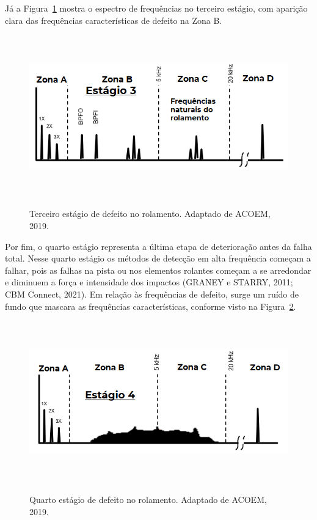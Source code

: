 \documentclass[
	12pt,				
	oneside,			
	a4paper,			
	english,			
	brazil,			
	]{abntex2ppgsi}
\begin{document}
Já a Figura~\ref{estagio_3} mostra o espectro de frequências no terceiro estágio, com aparição clara das frequências características de defeito na Zona B.

\begin{figure}[H]
\centering
\caption {Terceiro estágio de defeito no rolamento. Adaptado de ACOEM, 2019.}
\includegraphics[width=\textwidth,height=70mm,keepaspectratio]{estagio_3}
\label{estagio_3}
\end{figure}

Por fim, o quarto estágio representa a última etapa de deterioração antes da falha total. Nesse quarto estágio os métodos de detecção em alta frequência começam a falhar, pois as falhas na pista ou nos elementos rolantes começam a se arredondar e diminuem a força e intensidade dos impactos (GRANEY e STARRY, 2011; CBM Connect, 2021). Em relação às frequências de defeito, surge um ruído de fundo que mascara as frequências características, conforme visto na Figura~\ref{estagio_4}.

\begin{figure}[H]
\centering
\caption {Quarto estágio de defeito no rolamento. Adaptado de ACOEM, 2019.}
\includegraphics[width=\textwidth,height=70mm,keepaspectratio]{estagio_4}
\label{estagio_4}
\end{figure}
\end{document}
